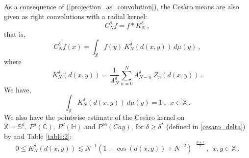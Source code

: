 \documentclass[12pt]{amsart}
\theoremstyle{definition}
\newcommand{\C}{\mathbb C}%
\newcommand{\Sb}{\mathbb S}%
\newcommand{\X}{\mathbb X}%
\newcommand{\Hb}{\mathbb H}%
\numberwithin{equation}{section}
\begin{document}
As a consequence of (\ref{projection_as_convolution}), the Ces\`aro means are also given as right convolutions with a radial kernel:
\begin{equation*}
C^\delta_Nf=f*K^\delta_N\:,
\end{equation*}
that is,
\begin{equation*}
C^\delta_Nf(x)=\int_{\X} f(y)\:
K^\delta_N(d(x,y))\:d\mu(y)\:,
\end{equation*}
where 
\begin{equation*}
K^\delta_N(d(x,y))=\frac{1}{A^\delta_N} \sum_{n=0}^N A^\delta_{N-n}\:Z_n(d(x,y))\:.
\end{equation*}
We have,
\begin{equation} \label{integral=1}
\int_{\X} K^\delta_N(d(x,y))\:d\mu(y)=1\:,\:\: x \in \X\:.
\end{equation}
We also have the pointwise estimate of the Ces\`aro kernel on $\X=\Sb^d,\:P^d(\C),\:P^d(\Hb)$ and $P^{16}(Cay)$, for $\delta \ge \delta^*$ (defined in \ref{cesaro_delta}) by \cite[Eqn. (B.1.13), Lemma B.1.2]{Dai} and Table \ref{table:2}:
\begin{equation} \label{cesaro_kernel_estimate}
0 \le K^\delta_N(d(x,y)) \lesssim N^{-1}\left(1-\cos(d(x,y)) +N^{-2}\right)^{-\frac{d+1}{2}}\:, \:\:x,y \in \X\:.
\end{equation}
\end{document}
